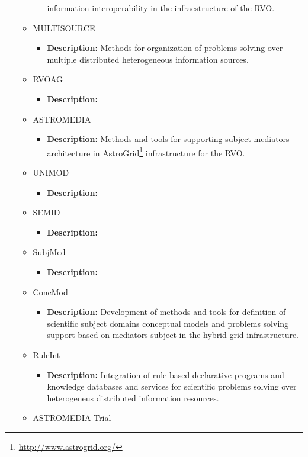 \begin{itemize}
\begin{itemize}
\begin{itemize}
information interoperability in the infraestructure of the RVO.
\end{itemize}
\item MULTISOURCE
\begin{itemize}
\item \textbf{Description:} Methods for organization of problems solving over
multiple distributed he\-te\-ro\-ge\-neous information sources.
\end{itemize}
\item RVOAG
\begin{itemize}
\item \textbf{Description:}
\end{itemize}
\item ASTROMEDIA
\begin{itemize}
\item \textbf{Description:} Methods and tools for supporting subject mediators
architecture in AstroGrid\footnote{\url{http://www.astrogrid.org/}}
infrastructure for the RVO.
\end{itemize}
\item UNIMOD
\begin{itemize}
\item \textbf{Description:}
\end{itemize}
\item SEMID
\begin{itemize}
\item \textbf{Description:}
\end{itemize}
\item SubjMed
\begin{itemize}
\item \textbf{Description:}
\end{itemize}
\item ConcMod
\begin{itemize}
\item \textbf{Description:} Development of methods and tools for definition of
scientific subject domains conceptual models and problems solving support based
on mediators subject in the hybrid grid-infrastructure.
\end{itemize}
\item RuleInt
\begin{itemize}
\item \textbf{Description:} Integration of rule-based declarative programs and
knowledge databases and services for scientific problems solving over
heterogeneus distributed information resources.
\end{itemize}
\item ASTROMEDIA Trial

\end{itemize}
\end{itemize}

